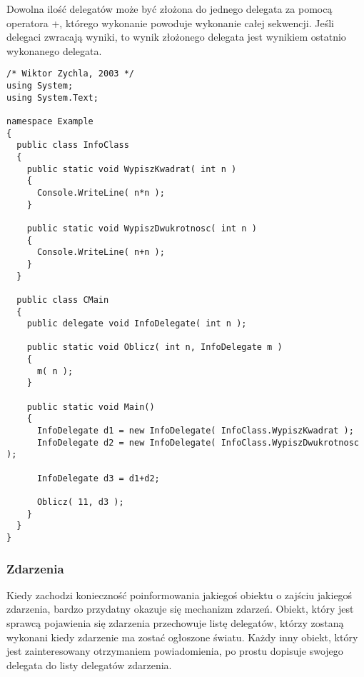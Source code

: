 Dowolna ilość delegatów może być złożona do jednego delegata za pomocą operatora +, którego wykonanie powoduje
wykonanie całej sekwencji. Jeśli delegaci zwracają wyniki, to wynik złożonego delegata jest wynikiem
ostatnio wykonanego delegata.

\begin{scriptsize}
\begin{verbatim}
/* Wiktor Zychla, 2003 */
using System;
using System.Text;

namespace Example
{ 
  public class InfoClass
  {
  	public static void WypiszKwadrat( int n )
  	{
  	  Console.WriteLine( n*n );
  	}
  	
  	public static void WypiszDwukrotnosc( int n )
  	{
  	  Console.WriteLine( n+n );
  	}
  }
	
  public class CMain
  {    
  	public delegate void InfoDelegate( int n );
  	
  	public static void Oblicz( int n, InfoDelegate m )
  	{
  	  m( n );
  	}
  	
    public static void Main()
    {
      InfoDelegate d1 = new InfoDelegate( InfoClass.WypiszKwadrat );
      InfoDelegate d2 = new InfoDelegate( InfoClass.WypiszDwukrotnosc );

      InfoDelegate d3 = d1+d2;

      Oblicz( 11, d3 );    	    	
    }
  }
}
\end{verbatim}
\end{scriptsize}

\subsubsection{Zdarzenia}

Kiedy zachodzi konieczność poinformowania jakiegoś obiektu o zajściu jakiegoś zdarzenia, bardzo przydatny
okazuje się mechanizm zdarzeń. Obiekt, który jest sprawcą pojawienia się zdarzenia przechowuje listę
delegatów, którzy zostaną wykonani kiedy zdarzenie ma zostać ogłoszone światu. Każdy inny obiekt, który
jest zainteresowany otrzymaniem powiadomienia, po prostu dopisuje swojego delegata do listy delegatów
zdarzenia.

